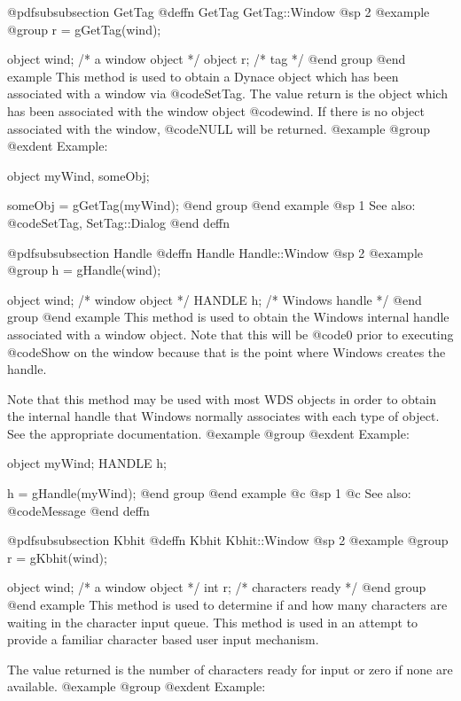 @pdfsubsubsection {GetTag}
@deffn {GetTag} GetTag::Window
@sp 2
@example
@group
r = gGetTag(wind);

object  wind;   /*  a window object   */
object  r;      /*  tag               */
@end group
@end example
This method is used to obtain a Dynace object which has been associated
with a window via @code{SetTag}.  The value return is the object which has
been associated with the window object @code{wind}.  If there is no object
associated with the window, @code{NULL} will be returned.
@example
@group
@exdent Example:

object  myWind, someObj;

someObj = gGetTag(myWind);
@end group
@end example
@sp 1
See also:  @code{SetTag, SetTag::Dialog}
@end deffn












@pdfsubsubsection {Handle}
@deffn {Handle} Handle::Window
@sp 2
@example
@group
h = gHandle(wind);

object  wind;   /*  window object  */
HANDLE  h;      /*  Windows handle */
@end group
@end example
This method is used to obtain the Windows internal handle associated with
a window object.  Note that this will be @code{0} prior to executing
@code{Show} on the window because that is the point where Windows creates
the handle.

Note that this method may be used with most WDS objects in order to obtain
the internal handle that Windows normally associates with each type of object.
See the appropriate documentation.
@example
@group
@exdent Example:

object  myWind;
HANDLE  h;

h = gHandle(myWind);
@end group
@end example
@c @sp 1
@c See also:  @code{Message}
@end deffn






@pdfsubsubsection {Kbhit}
@deffn {Kbhit} Kbhit::Window
@sp 2
@example
@group
r = gKbhit(wind);

object  wind;   /*  a window object   */
int     r;      /*  characters ready  */
@end group
@end example
This method is used to determine if and how many characters are waiting
in the character input queue.  This method is used in an attempt to
provide a familiar character based user input mechanism.

The value returned is the number of characters ready for input or
zero if none are available.
@example
@group
@exdent Example:

